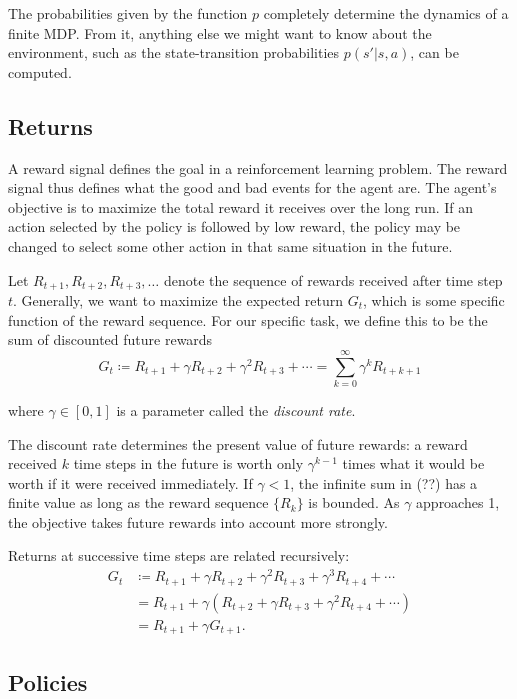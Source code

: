 The probabilities given by the function $p$ completely determine the dynamics of a finite MDP. From it, anything else we might want to know about the environment, such as the state-transition probabilities $p(s' | s, a)$, can be computed.

\subsection{Returns}

A reward signal defines the goal in a reinforcement learning problem. The reward signal thus defines what the good and bad events for the agent are. The agent’s objective is to maximize the total reward it receives over the long run. If an action selected by the policy is followed by low reward, the policy may be changed to select some other action in that same situation in the future.

Let $R_{t+1}, R_{t+2}, R_{t+3}, \dots$ denote the sequence of rewards received after time step $t$. Generally, we want to maximize the expected return $G_t$, which is some specific function of the reward sequence. For our specific task, we define this to be the sum of discounted future rewards
\[
G_t \coloneqq R_{t+1} + \gamma R_{t+2} + \gamma^2 R_{t+3} + \cdots = \sum_{k=0}^{\infty} \gamma^{k}R_{t+k+1}
\]

where $\gamma \in [0,1]$ is a parameter called the \textit{discount rate}.

The discount rate determines the present value of future rewards: a reward received $k$ time steps in the future is worth only $\gamma^{k-1}$ times what it would be worth if it were received immediately. If $\gamma < 1$, the infinite sum in (??) has a finite value as long as the reward sequence $\{R_k\}$ is bounded. As $\gamma$ approaches 1, the objective takes future rewards into account more strongly.

Returns at successive time steps are related recursively:
\begin{align}
    G_t &\coloneqq R_{t+1} + \gamma R_{t+2} + \gamma^2 R_{t+3} + \gamma^3 R_{t+4} + \cdots \nonumber\\
    &= R_{t+1} + \gamma (R_{t+2} + \gamma R_{t+3} + \gamma^2 R_{t+4} + \cdots) \nonumber\\
    &= R_{t+1} + \gamma G_{t+1}.
\end{align}

\subsection{Policies}


